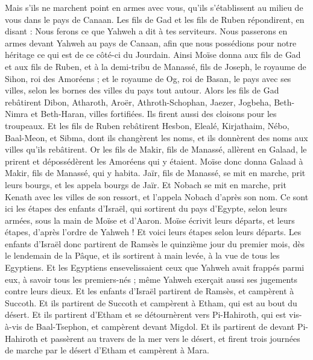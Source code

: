 \begin{multicols}{2}
Mais s'ils ne marchent point en armes avec vous, qu'ils s'établissent au milieu de vous dans le pays de Canaan.
Les fils de Gad et les fils de Ruben répondirent, en disant : Nous ferons ce que Yahweh a dit à tes serviteurs.
Nous passerons en armes devant Yahweh au pays de Canaan, afin que nous possédions pour notre héritage ce qui est de ce côté-ci du Jourdain.
Ainsi Moïse donna aux fils de Gad et aux fils de Ruben, et à la demi-tribu de Manassé, fils de Joseph, le royaume de Sihon, roi des Amoréens ; et le royaume de Og, roi de Basan, le pays avec ses villes, selon les bornes des villes du pays tout autour.
Alors les fils de Gad rebâtirent Dibon, Atharoth, Aroër,
Athroth-Schophan, Jaezer, Jogbeha,
Beth-Nimra et Beth-Haran, villes fortifiées. Ils firent aussi des cloisons pour les troupeaux.
Et les fils de Ruben rebâtirent Hesbon, Elealé, Kirjathaim,
Nébo, Baal-Meon, et Sibma, dont ils changèrent les noms, et ils donnèrent des noms aux villes qu'ils rebâtirent.
Or les fils de Makir, fils de Manassé, allèrent en Galaad, le prirent et dépossédèrent les Amoréens qui y étaient.
Moïse donc donna Galaad à Makir, fils de Manassé, qui y habita.
Jaïr, fils de Manassé, se mit en marche, prit leurs bourgs, et les appela bourgs de Jaïr.
Et Nobach se mit en marche, prit Kenath avec les villes de son ressort, et l'appela Nobach d'après son nom.
\VerseOne{}Ce sont ici les étapes des enfants d'Israël, qui sortirent du pays d'Egypte, selon leurs armées, sous la main de Moïse et d'Aaron.
Moïse écrivit leurs départs, et leurs étapes, d'après l'ordre de Yahweh ! Et voici leurs étapes selon leurs départs.
Les enfants d'Israël donc partirent de Ramsès le quinzième jour du premier mois, dès le lendemain de la Pâque, et ils sortirent à main levée, à la vue de tous les Egyptiens.
Et les Egyptiens ensevelissaient ceux que Yahweh avait frappés parmi eux, à savoir tous les premiers-nés ; même Yahweh exerçait aussi ses jugements contre leurs dieux.
Et les enfants d'Israël partirent de Ramsès, et campèrent à Succoth.
Et ils partirent de Succoth et campèrent à Etham, qui est au bout du désert.
Et ils partirent d'Etham et se détournèrent vers Pi-Hahiroth, qui est vis-à-vis de Baal-Tsephon, et campèrent devant Migdol.
Et ils partirent de devant Pi-Hahiroth et passèrent au travers de la mer vers le désert, et firent trois journées de marche par le désert d'Etham et campèrent à Mara.

\end{multicols}
